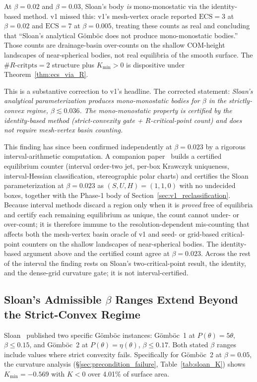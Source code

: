 \documentclass[11pt,a4paper]{article}
\begin{document}
At $\beta = 0.02$ and $\beta = 0.03$, Sloan's body \emph{is}
mono-monostatic via the identity-based method. v1 missed this:
v1's mesh-vertex oracle reported $\mathrm{ECS} = 3$ at $\beta = 0.02$
and $\mathrm{ECS} = 7$ at $\beta = 0.005$, treating these counts as
real and concluding that ``Sloan's analytical Gömböc does not produce
mono-monostatic bodies.'' Those counts are drainage-basin
over-counts on the shallow COM-height landscapes of near-spherical
bodies, not real equilibria of the smooth surface. The
$\#R\text{-critpts} = 2$ structure plus $K_{\min} > 0$ is dispositive
under Theorem~\ref{thm:ecs_via_R}.

This is a substantive correction to v1's headline. The corrected
statement: \emph{Sloan's analytical parameterization produces
mono-monostatic bodies for $\beta$ in the strictly-convex regime,
$\beta \lesssim 0.036$. The mono-monostatic property is certified by
the identity-based method (strict-convexity gate + $R$-critical-point
count) and does not require mesh-vertex basin counting.}

This finding has since been confirmed independently at $\beta = 0.023$
by a rigorous interval-arithmetic computation. A companion
paper~\cite{couey2026harmonic} builds a certified equilibrium counter
(interval order-two jet, per-box Krawczyk uniqueness, interval-Hessian
classification, stereographic polar charts) and certifies the Sloan
parameterization at $\beta = 0.023$ as $(S, U, H) = (1, 1, 0)$ with no
undecided boxes, together with the Phase-1 body of
Section~\ref{sec:v1_reclassification}. Because interval methods discard
a region only when it is \emph{proved} free of equilibria and certify
each remaining equilibrium as unique, the count cannot under- or
over-count; it is therefore immune to the resolution-dependent
mis-counting that affects both the mesh-vertex basin oracle of v1 and
seed- or grid-based critical-point counters on the shallow landscapes
of near-spherical bodies. The identity-based argument above and the
certified count agree at $\beta = 0.023$. Across the rest of the
interval the finding rests on Sloan's two-critical-point result, the
identity, and the dense-grid curvature gate; it is not
interval-certified.

\subsection{Sloan's Admissible $\beta$ Ranges Extend Beyond the
Strict-Convex Regime}
\label{sec:sloan_published_fails}

Sloan~\cite{sloan2023} published two specific G\"omb\"oc instances:
G\"omb\"oc~1 at $P(\theta) = 5\theta$, $\beta \le 0.15$, and
G\"omb\"oc~2 at $P(\theta) = \eta(\theta)$, $\beta \le 0.17$. Both
stated $\beta$ ranges include values where strict convexity fails.
Specifically for G\"omb\"oc~2 at $\beta = 0.05$, the curvature
analysis (\S\ref{sec:precondition_failure}, Table~\ref{tab:sloan_K})
shows $K_{\min} = -0.569$ with $K < 0$ over 4.01\% of surface area.
\end{document}
